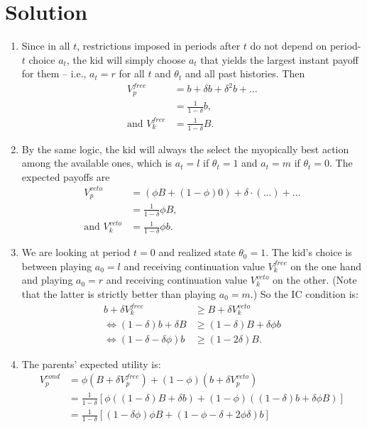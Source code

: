 \documentclass[a4paper]{article}
\begin{document}
\section*{Solution}
	\begin{enumerate}
		\item Since in all $t$, restrictions imposed in periods after $t$ do not depend on period-$t$ choice $a_t$, the kid will simply choose $a_t$ that yields the largest instant payoff for them -- i.e., $a_t=r$ for all $t$ and $\theta_t$ and all past histories. Then
		\begin{align*}
			V_p^{free} &= b + \delta b + \delta^2 b + \dots 
			\\
			&= \frac{1}{1-\delta}b,
			\\
			\text{and }V_k^{free} &= \frac{1}{1-\delta} B.
		\end{align*}
		
		\item By the same logic, the kid will always the select the myopically best action among the available ones, which is $a_t = l$ if $\theta_t = 1$ and $a_t = m$ if $\theta_t = 0$. The expected payoffs are
		\begin{align*}
			V_p^{veto} &= (\phi B + (1-\phi) 0) + \delta \cdot (...) + \dots
			\\
			&= \frac{1}{1-\delta} \phi B,
			\\
			\text{and }V_k^{veto} &= \frac{1}{1-\delta} \phi b.
		\end{align*}
		
		\item We are looking at period $t=0$ and realized state $\theta_0 = 1$. The kid's choice is between playing $a_0 = l$ and receiving continuation value $V_k^{free}$ on the one hand and playing $a_0 = r$ and receiving continuation value $V_k^{veto}$ on the other. (Note that the latter is strictly better than playing $a_0=m$.) So the IC condition is:
		\begin{align}
			b + \delta V_k^{free} &\geq B + \delta V_k^{veto}
			\nonumber
			\\
			\iff (1-\delta) b + \delta B & \geq (1-\delta) B + \delta \phi b
			\nonumber
			\\
			\iff (1-\delta-\delta \phi) b & \geq (1-2\delta) B.
			\label{eq:kidIC}
		\end{align}
		
		\item The parents' expected utility is:
		\begin{align*}
			V_p^{cond} &= \phi \left( B + \delta V_p^{free} \right)+ (1-\phi) \left( b + \delta V_p^{veto} \right) 
			\\
			&= \frac{1}{1-\delta} \left[ \phi \left( (1-\delta)B + \delta b \right)+ (1-\phi) \left( (1-\delta)b + \delta \phi B \right) \right]
			\\
			&= \frac{1}{1-\delta} \left[ (1-\delta \phi) \phi B + (1-\phi - \delta + 2 \phi \delta) b \right]
		\end{align*}
	

\end{enumerate}
\end{document}
